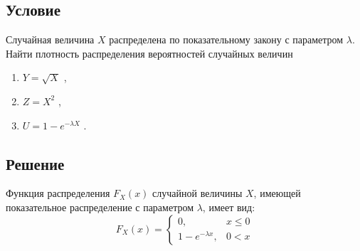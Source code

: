 \documentclass[12pt,a4paper]{article}
\begin{document}
    \subsection*{Условие}
    Случайная величина $X$ распределена по показательному закону с параметром $\lambda$. Найти плотность распределения вероятностей случайных величин
    \begin{enumerate}
        \item $Y = \sqrt{X}$ ,
        \item $Z = X^2$ ,
        \item $U = 1 - e^{-\lambda X}$ .
    \end{enumerate}

    \subsection*{Решение}
    Функция распределения $F_X(x)$ случайной величины $X$, имеющей показательное распределение с параметром $\lambda$, имеет вид:
    \begin{equation}
        F_X(x)
        = \left \{
        \begin{array}{ll}
            0,                   & x \le 0 \\
            1 - e^{-\lambda x} , & 0 < x
        \end{array}
        \right .
    \end{equation}
\end{document}
